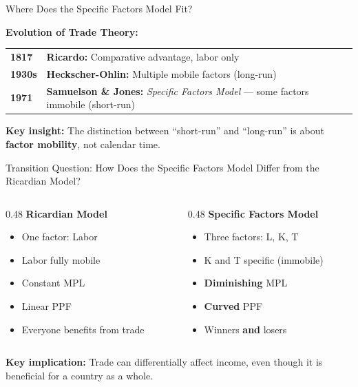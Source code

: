 \documentclass{beamer}
\begin{document}
\begin{frame}{Where Does the Specific Factors Model Fit?}

\textbf{Evolution of Trade Theory:}

\vspace{0.3cm}

\begin{tabular}{lp{7cm}}
\textbf{1817} & \textbf{Ricardo:} Comparative advantage, labor only \\[0.2cm]
\textbf{1930s} & \textbf{Heckscher-Ohlin:} Multiple mobile factors (long-run) \\[0.2cm]
\textbf{1971} & \textbf{Samuelson \& Jones:} \textit{Specific Factors Model} --- some factors immobile (short-run)
\end{tabular}

\vspace{0.5cm}

\textbf{Key insight:} The distinction between ``short-run'' and ``long-run'' is about \textbf{factor mobility}, not calendar time.

\end{frame}

\begin{frame}{Transition Question: How Does the Specific Factors Model Differ from the Ricardian Model?}

\begin{columns}[T]
\begin{column}{0.48\textwidth}
\textbf{Ricardian Model}
\begin{itemize}
    \item One factor: Labor
    \item Labor fully mobile
    \item Constant MPL
    \item Linear PPF
    \item Everyone benefits from trade
\end{itemize}
\end{column}

\begin{column}{0.48\textwidth}
\textbf{Specific Factors Model}
\begin{itemize}
    \item Three factors: L, K, T
    \item K and T specific (immobile)
    \item \textbf{Diminishing} MPL
    \item \textbf{Curved} PPF
    \item Winners \textbf{and} losers
\end{itemize}
\end{column}
\end{columns}

\vspace{0.5cm}

\textbf{Key implication:} Trade can differentially affect income, even though it is beneficial for a country as a whole.

\end{frame}
\end{document}
